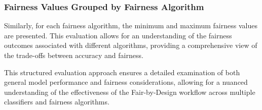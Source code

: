 \subsubsection{Fairness Values Grouped by Fairness Algorithm}

Similarly, for each fairness algorithm, the minimum and maximum fairness values are presented. This evaluation allows for an understanding of the fairness outcomes associated with different algorithms, providing a comprehensive view of the trade-offs between accuracy and fairness.

This structured evaluation approach ensures a detailed examination of both general model performance and fairness considerations, allowing for a nuanced understanding of the effectiveness of the Fair-by-Design workflow across multiple classifiers and fairness algorithms.